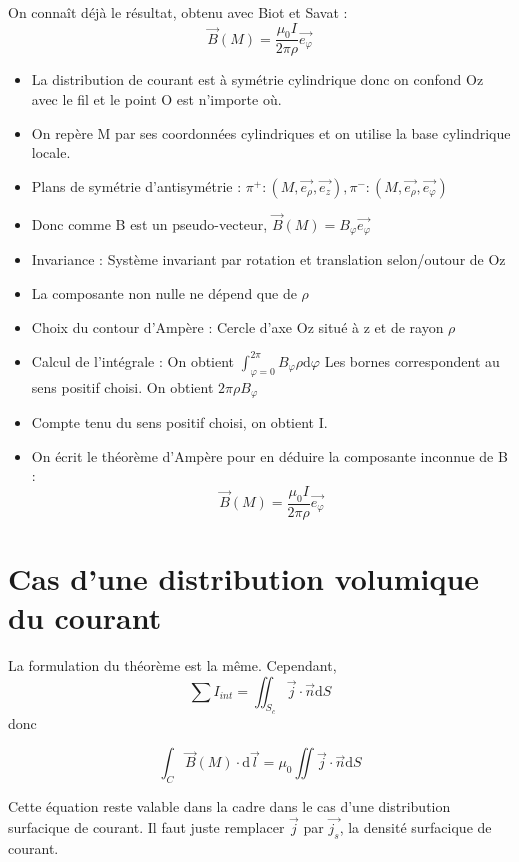 \documentclass[french]{yLectureNote}
\renewcommand{\vec}{\overrightarrow}
\newcommand{\dd}{\mathrm{d}}
\newcommand{\B}{\vec{B}(M)}
\newcommand{\er}{\vec{e_{\rho}}}
\newcommand{\ep}{\vec{e_{\varphi}}}
\newcommand{\pip}{\pi^+}
\newcommand{\pim}{\pi^-}
\begin{document}
On conna\^it déjà le résultat, obtenu avec Biot et Savat : \[\B = \frac{\mu_0 I}{2\pi \rho}\ep\]
\begin{itemize}
 \item La distribution de courant est à symétrie cylindrique donc on confond Oz avec le fil et le point O est n'importe où.
 \item On repère M par ses coordonnées cylindriques et on utilise la base cylindrique locale.
 \item Plans de symétrie d'antisymétrie : \(\pip : (M, \er, \vec{e_z}), \pim : (M, \er, \ep)\)
 \item Donc comme B est un pseudo-vecteur, \(\B = B_{\varphi}\ep\)
 \item Invariance : Système invariant par rotation et translation selon/outour de Oz
 \item La composante non nulle ne dépend que de \(\rho\)
 \item Choix du contour d'Ampère : Cercle d'axe Oz situé à z et de rayon \(\rho\)
 \item Calcul de l'intégrale : On obtient \(\int_{ \varphi = 0}^{2\pi} B_{\varphi}\rho \dd \varphi\) Les bornes correspondent au sens positif choisi. On obtient \(2\pi \rho B_{\varphi}\)
 \item Compte tenu du sens positif choisi, on obtient I.
 \item On écrit le théorème d'Ampère pour en déduire la composante inconnue de B : \[\B = \frac{\mu_0 I}{2\pi \rho}\ep\]
\end{itemize}
\section{Cas d'une distribution volumique du courant}
La formulation du théorème est la m\^eme. Cependant, \[\sum I_{int} = \iint_{S_c}\vec{j}\cdot \vec{n}\dd S\] donc
\begin{theorem}[]
 \[\int_C\B\cdot \dd \vec{l} = \mu_0 \iint \vec{j}\cdot \vec{n}\dd S\]
\end{theorem}
Cette équation reste valable dans la cadre dans le cas d'une distribution surfacique de courant. Il faut juste remplacer \(\vec{j}\) par \(\vec{j_s}\), la densité surfacique de courant.
\end{document}

